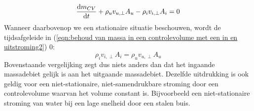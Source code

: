 \begin{equation}
	\dfrac{\mathrm{d} m_{CV}}{\mathrm{d} t} + \rho_{u} v_{u,\perp} A_{u} - \rho_{i} v_{i,\perp} A_{i} = 0
	\label{eqn:behoud van massa in een controlevolume met een in en uitstroming2}
\end{equation}
Wanneer daarbovenop we een stationaire situatie beschouwen, wordt de tijdsafgeleide in (\ref{eqn:behoud van massa in een controlevolume met een in en uitstroming2}) $0$:
\begin{equation}
	\rho_i v_{i,\perp} A_i = \rho_u v_{u,\perp} A_u
	\label{eqn:behoud van massa in een stationair controlevolume met een in en uitstroming}
\end{equation}
Bovenstaande vergelijking zegt dus niets anders dan dat het ingaande massadebiet gelijk is aan het uitgaande massadebiet. Dezelfde uitdrukking is ook geldig voor een niet-stationaire, niet-samendrukbare stroming door een controlevolume waarvan het volume constant is. Bijvoorbeeld een niet-stationaire stroming van water bij een lage snelheid door een stalen buis.

